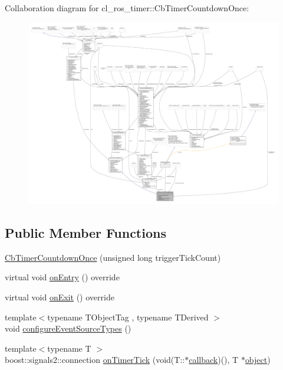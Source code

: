 Collaboration diagram for cl\+\_\+ros\+\_\+timer\+:\+:Cb\+Timer\+Countdown\+Once\+:
\nopagebreak
\begin{figure}[H]
\begin{center}
\leavevmode
\includegraphics[width=350pt]{classcl__ros__timer_1_1CbTimerCountdownOnce__coll__graph}
\end{center}
\end{figure}
\subsection*{Public Member Functions}
\begin{DoxyCompactItemize}
\item 
\hyperlink{classcl__ros__timer_1_1CbTimerCountdownOnce_a41161c36e1c3b1767c02884d28649ccd}{Cb\+Timer\+Countdown\+Once} (unsigned long trigger\+Tick\+Count)
\item 
virtual void \hyperlink{classcl__ros__timer_1_1CbTimerCountdownOnce_a613662c4a4106ece0ce1dee198d1aba2}{on\+Entry} () override
\item 
virtual void \hyperlink{classcl__ros__timer_1_1CbTimerCountdownOnce_ab602b778a299b42e8cc9f4bf3da0a234}{on\+Exit} () override
\item 
{\footnotesize template$<$typename T\+Object\+Tag , typename T\+Derived $>$ }\\void \hyperlink{classcl__ros__timer_1_1CbTimerCountdownOnce_a12c63ab8ca0d90859f6b7fc1212b504e}{configure\+Event\+Source\+Types} ()
\item 
{\footnotesize template$<$typename T $>$ }\\boost\+::signals2\+::connection \hyperlink{classcl__ros__timer_1_1CbTimerCountdownOnce_a1e20a8c9a9907db8a1d7dacf8c60ad27}{on\+Timer\+Tick} (void(T\+::$\ast$\hyperlink{3_2servers_2opencv__perception__node_2opencv__perception__node_8cpp_a050e697bd654facce10ea3f6549669b3}{callback})(), T $\ast$\hyperlink{classobject}{object})
\end{DoxyCompactItemize}
